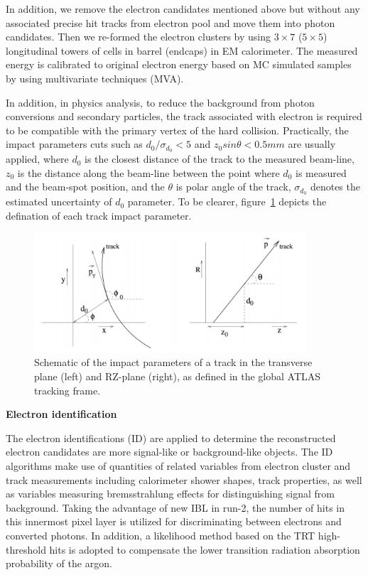 \begin{enumerate}
In addition, we remove the electron candidates mentioned above but without any associated precise hit tracks from electron pool and move them into photon candidates. Then we re-formed the electron clusters by using $3 \times 7$ ($5 \times 5$) longitudinal towers of cells in barrel (endcaps) in EM calorimeter. The measured energy is calibrated to original electron energy based on MC simulated samples by using multivariate techniques (MVA).
\end{enumerate}

In addition, in physics analysis, to reduce the background from photon conversions and secondary particles, the track associated with electron is required to be compatible with the primary vertex of the hard collision. 
Practically, the impact parameters cuts such as $d_{0}/\sigma_{d_{0}} < 5$ and $z_{0}sin\theta < 0.5mm$ are usually applied, where $d_{0}$ is the closest distance of the track to the measured beam-line, $z_{0}$ is the distance along the beam-line between the point where $d_{0}$ is measured and the beam-spot position, and the $\theta$ is polar angle of the track, $\sigma_{d_{0}}$ denotes the estimated uncertainty of $d_{0}$ parameter. 
To be clearer, figure~\ref{fig:ele_d0z0} depicts the defination of each track impact parameter.
\begin{figure}[!htb]
  \centering
  \includegraphics[width=0.9\textwidth]{figures/Simulation/track_parameter_2d.png}
  \caption{Schematic of the impact parameters of a track in the transverse plane (left)
and RZ-plane (right), as defined in the global ATLAS tracking frame\cite{Limper:1202457}.}
  \label{fig:ele_d0z0}
\end{figure}

\textbf{Electron identification}

The electron identifications (ID) are applied to determine the reconstructed electron candidates are more signal-like or background-like objects.
The ID algorithms make use of quantities of related variables from electron cluster and track measurements including calorimeter shower shapes, track properties, 
as well as variables measuring bremsstrahlung effects for distinguishing signal from background.
Taking the advantage of new IBL in run-2, the number of hits in this innermost pixel layer is utilized for discriminating between electrons and converted photons.
In addition, a likelihood method based on the TRT high-threshold hits is adopted to compensate the lower transition radiation absorption probability of the argon.


